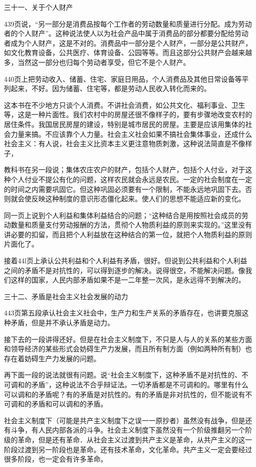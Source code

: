 三十一、关于个人财产

439页说，“另一部分是消费品按每个工作者的劳动数量和质量进行分配。成为劳动者的个人财产”。这种说法使人以为社会产品中属于消费品的部分都要分配给劳动者成为个人财产，这是不对的。消费品中一部分是个人财产，一部分是公共财产，如文化教育设备，公共医疗、体育设备、公园等等。而且这部分公共财产会越来越多，当然这一部分也归每个劳动者享受，但它不是个人财产。

440页上把劳动收入、储蓄、住宅、家庭日用品，个人消费品及其他日常设备等平列起来，不好。因为储蓄、住宅等，都是劳动人民收入转化而来的。

这本书在不少地方只谈个人消费。不讲社会消费，如公共文化、福利事业、卫生等，这是一种片面性。我们农村中的房屋还很不像样子的，要有步骤地改变农村的居住条件。我国居民房屋的建设，特别是城市居民的房屋。主要是应该用集体的社会力量来搞。不应该靠个人力量。社会主义社会如果不搞社会集体事业，还成什么社会主义：有人说，社会主义比资本主义更注意物质刺激，这种说法简直是不像样子，

教科书在另一段说；集体农庄农户的财产，包括个人财产，包括个人付业，对于这种个人付业不提公有化的问题，这样农民就会永远是农民。一定的社会制度在一定的时间之内需要巩固它。但这种巩固必须要有一个限制，不能永远地巩固下去。否则就会使反映这种制度的意识形态僵化起来。使人们的思想不能适应新的变化。

同一页上说到个人利益和集体利益结合的问题；“这种结合是用按照社会成员的劳动数量和质量支付劳动报酬的方法，贯彻个人物质利益的原则来实现的。”这里没有讲必要的扣留，而且把个人利益放在这种结合的第一位，就把个人物质利益的原则片面化了。

接着44l页上承认公共利益和个人利益有矛盾，很好。但说到公共利益和个人利益之间的矛盾不是对抗性的，可以得到逐步的解决。说得很空，不能解决问题。像我们这样的国家，人民内部矛盾如果不是一二年整一次风，是永远得不到解决的。

三十二、矛盾是社会主义社会发展的动力

443页第五段承认社会主义社会中，生产力和生产关系的矛盾存在，也讲要克服这种矛盾，但是并不承认矛盾是动力。

接下去的一段讲得还好。但是在社会主义制度下，不只是人与人的关系的某些方面和领导经济的某些形式会妨碍生产力发展，而且所有制方面（例如两种所有制）也存在着妨碍生产力发展的问题。

再下面一段的说法就很有问题。说“社会主义制度下，这种矛盾不是对抗性的、不可调和的矛盾”，这种说法不合乎辩证法。一切矛盾都是不可调和的。哪里有什么可以调和的矛盾呢？有的矛盾是对抗性的。有的矛盾是非对抗性的，但不能说有不可调和的矛盾和可以调和的矛盾。

社会主义制度下（可能是共产主义制度下之误一一原抄者）虽然没有战争，但是还有斗争，有人民内部各派的斗争。社会主义制度下虽然没有一个阶级推翻另一个阶级的革命，但是还有革命．从社会主义过渡到共产主义是革命，从共产主义的这一阶段过渡到另一阶段也是革命。还有技术革命，文化革命。共产主义一定会要经过很多阶段，也一定会有许多革命。

